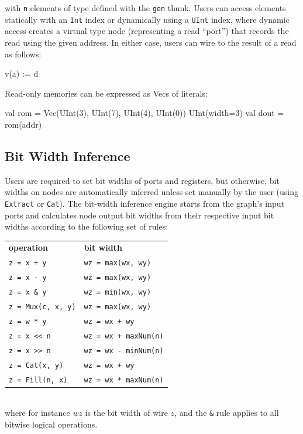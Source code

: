 \documentclass[10pt,twocolumn]{article}
\def\code#1{{\small\tt #1}}
\begin{document}
\noindent
with \code{n} elements of type defined with the \code{gen} thunk.
Users can access elements statically with an \code{Int} index or
dynamically using a \code{UInt} index, 
where dynamic access creates a virtual type node (representing a read
``port'') that records the read using the given address.  In either case,
users can wire to the result of a read as follows:

\begin{scala}
v(a) := d
\end{scala}

Read-only memories can be expressed as Vecs of literals:

\begin{scala}
val rom = Vec(UInt(3), UInt(7), UInt(4), UInt(0)) { UInt(width=3) }
val dout = rom(addr)
\end{scala}


\subsection{Bit Width Inference}

Users are required to set bit widths of ports and registers, but otherwise,
bit widths on nodes are automatically inferred unless set manually by
the user (using \code{Extract} or \code{Cat}).
The bit-width inference engine starts from the graph's input ports and 
calculates node output bit widths from their respective input bit widths according to the following set of rules:\\[-2mm]

{\small
\begin{tabular}{ll}
{\bf operation} & {\bf bit width} \\ 
\verb|z = x + y| & \verb+wz = max(wx, wy)+ \\
\verb+z = x - y+ & \verb+wz = max(wx, wy)+\\
\verb+z = x & y+ & \verb+wz = min(wx, wy)+ \\
\verb+z = Mux(c, x, y)+ & \verb+wz = max(wx, wy)+ \\
\verb+z = w * y+ & \verb!wz = wx + wy! \\
\verb+z = x << n+ & \verb!wz = wx + maxNum(n)! \\
\verb+z = x >> n+ & \verb+wz = wx - minNum(n)+ \\
\verb+z = Cat(x, y)+ & \verb!wz = wx + wy! \\
\verb+z = Fill(n, x)+ & \verb+wz = wx * maxNum(n)+ \\
\end{tabular}
}
\\[1mm]
\noindent  
where for instance $wz$ is the bit width of wire $z$, and the \verb+&+
rule applies to all bitwise logical operations.
\end{document}
